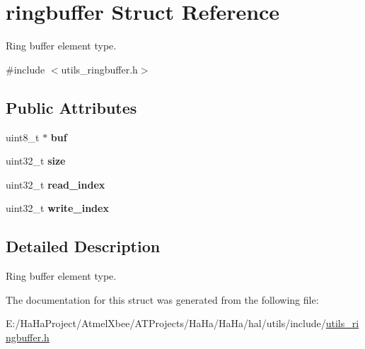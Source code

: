 \hypertarget{structringbuffer}{}\section{ringbuffer Struct Reference}
\label{structringbuffer}


Ring buffer element type.  




{\ttfamily \#include $<$utils\+\_\+ringbuffer.\+h$>$}

\subsection*{Public Attributes}
\begin{DoxyCompactItemize}
\item 
\mbox{\label{structringbuffer_a21e527bd1cee84a7b2c3d6d2da77584c}} 
uint8\+\_\+t $\ast$ {\bfseries buf}
\item 
\mbox{\label{structringbuffer_a80a0c2fba71bab6481fe1a0bab9685ae}} 
uint32\+\_\+t {\bfseries size}
\item 
\mbox{\label{structringbuffer_a1690488f3cc00713f660ab13ee18be5e}} 
uint32\+\_\+t {\bfseries read\+\_\+index}
\item 
\mbox{\label{structringbuffer_a93936ef6a8e070e065448dbf49dcc93b}} 
uint32\+\_\+t {\bfseries write\+\_\+index}
\end{DoxyCompactItemize}


\subsection{Detailed Description}
Ring buffer element type. 

The documentation for this struct was generated from the following file\+:\begin{DoxyCompactItemize}
\item 
E\+:/\+Ha\+Ha\+Project/\+Atmel\+Xbee/\+A\+T\+Projects/\+Ha\+Ha/\+Ha\+Ha/hal/utils/include/\hyperlink{utils__ringbuffer_8h}{utils\+\_\+ringbuffer.\+h}\end{DoxyCompactItemize}
